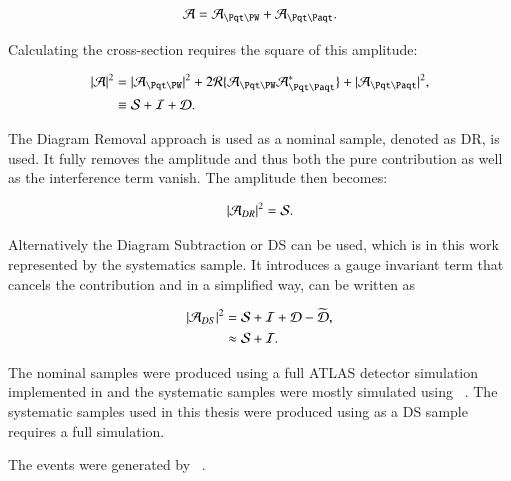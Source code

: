 \begin{align}
\Aamp = \Atw + \Att.
\end{align}

Calculating the cross-section requires the square of this amplitude:

\begin{align}
|\Aamp|^2 &= |\Atw|^2 + 2 \mathcal{R} \{ \Atw \Att^{\ast} \} + |\Att|^2, \\
&\equiv \Samp + \Iamp + \Damp.
\end{align}

The Diagram Removal approach is used as a nominal sample, denoted as DR, is used. It fully removes the \Att amplitude and thus both the pure \ttbar contribution as well as the interference term vanish. The amplitude then becomes:

\begin{align}
| \mathcal{A}_{DR} |^2 = \mathcal{S}.
\end{align}

Alternatively the Diagram Subtraction or DS can be used, which is in this work represented by the systematics sample. It introduces a gauge invariant term that cancels the \ttbar contribution and in a simplified way, can be written as

\begin{align}
| \mathcal{A}_{DS} |^2 &= \mathcal{S} + \mathcal{I} + \mathcal{D} - \widetilde{\mathcal{D}},\\
&\approx \mathcal{S} + \mathcal{I}.
\end{align}

The nominal samples were produced using a full ATLAS detector simulation implemented in \GEANTfour and the systematic samples were mostly simulated using \ATLFASTtwo~\cite{geant, atlfast}. The systematic samples used in this thesis were produced using \GEANTfour as a DS sample requires a full simulation.

The events were generated by \POWHEG{}~\cite{pythia}.

